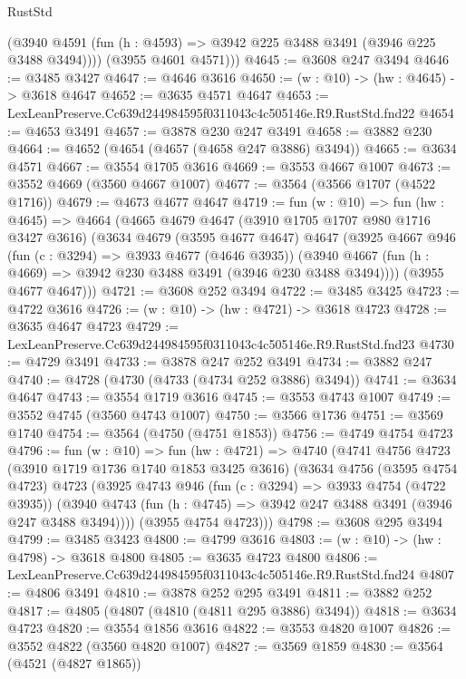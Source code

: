 \begin{lexlean}{RustStd}
\begin{coremodule}
          (@3940 @4591 (fun (h : @4593) => @3942 @225 @3488 @3491 (@3946 @225 @3488 @3494))))
        (@3955 @4601 @4571)))
@4645 := @3608 @247 @3494
@4646 := @3485 @3427
@4647 := @4646 @3616
@4650 := (w : @10) -> (hw : @4645) -> @3618 @4647
@4652 := @3635 @4571 @4647
@4653 := LexLeanPreserve.Cc639d244984595f0311043c4c505146e.R9.RustStd.fnd22
@4654 := @4653 @3491
@4657 := @3878 @230 @247 @3491
@4658 := @3882 @230
@4664 := @4652 (@4654 (@4657 (@4658 @247 @3886) @3494))
@4665 := @3634 @4571
@4667 := @3554 @1705 @3616
@4669 := @3553 @4667 @1007
@4673 := @3552 @4669 (@3560 @4667 @1007)
@4677 := @3564 (@3566 @1707 (@4522 @1716))
@4679 := @4673 @4677 @4647
@4719 := fun (w : @10) =>
  fun (hw : @4645) =>
  @4664
    (@4665
      @4679
      @4647
      (@3910 @1705 @1707 @980 @1716 @3427 @3616)
      (@3634
        @4679
        (@3595 @4677 @4647)
        @4647
        (@3925
          @4667
          @946
          (fun (c : @3294) => @3933 @4677 (@4646 @3935))
          (@3940 @4667 (fun (h : @4669) => @3942 @230 @3488 @3491 (@3946 @230 @3488 @3494))))
        (@3955 @4677 @4647)))
@4721 := @3608 @252 @3494
@4722 := @3485 @3425
@4723 := @4722 @3616
@4726 := (w : @10) -> (hw : @4721) -> @3618 @4723
@4728 := @3635 @4647 @4723
@4729 := LexLeanPreserve.Cc639d244984595f0311043c4c505146e.R9.RustStd.fnd23
@4730 := @4729 @3491
@4733 := @3878 @247 @252 @3491
@4734 := @3882 @247
@4740 := @4728 (@4730 (@4733 (@4734 @252 @3886) @3494))
@4741 := @3634 @4647
@4743 := @3554 @1719 @3616
@4745 := @3553 @4743 @1007
@4749 := @3552 @4745 (@3560 @4743 @1007)
@4750 := @3566 @1736
@4751 := @3569 @1740
@4754 := @3564 (@4750 (@4751 @1853))
@4756 := @4749 @4754 @4723
@4796 := fun (w : @10) =>
  fun (hw : @4721) =>
  @4740
    (@4741
      @4756
      @4723
      (@3910 @1719 @1736 @1740 @1853 @3425 @3616)
      (@3634
        @4756
        (@3595 @4754 @4723)
        @4723
        (@3925
          @4743
          @946
          (fun (c : @3294) => @3933 @4754 (@4722 @3935))
          (@3940 @4743 (fun (h : @4745) => @3942 @247 @3488 @3491 (@3946 @247 @3488 @3494))))
        (@3955 @4754 @4723)))
@4798 := @3608 @295 @3494
@4799 := @3485 @3423
@4800 := @4799 @3616
@4803 := (w : @10) -> (hw : @4798) -> @3618 @4800
@4805 := @3635 @4723 @4800
@4806 := LexLeanPreserve.Cc639d244984595f0311043c4c505146e.R9.RustStd.fnd24
@4807 := @4806 @3491
@4810 := @3878 @252 @295 @3491
@4811 := @3882 @252
@4817 := @4805 (@4807 (@4810 (@4811 @295 @3886) @3494))
@4818 := @3634 @4723
@4820 := @3554 @1856 @3616
@4822 := @3553 @4820 @1007
@4826 := @3552 @4822 (@3560 @4820 @1007)
@4827 := @3569 @1859
@4830 := @3564 (@4521 (@4827 @1865))

\end{coremodule}
\end{lexlean}
